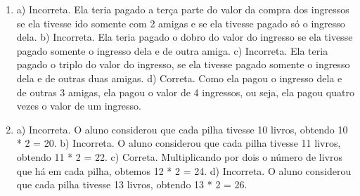 \begin{enumerate}
\item
a) Incorreta. Ela teria pagado a terça parte do valor da compra dos ingressos se ela
tivesse ido somente com 2 amigas e se ela tivesse pagado só o ingresso
dela.
b) Incorreta. Ela teria pagado o dobro do valor do ingresso se ela
tivesse pagado somente o ingresso dela e de outra amiga.
c) Incorreta. Ela teria pagado o triplo do valor do ingresso, se ela
tivesse pagado somente o ingresso dela e de outras duas amigas.
d) Correta. Como ela pagou o ingresso dela e de outras 3 amigas, ela
pagou o valor de 4 ingressos, ou seja, ela pagou quatro vezes o valor de um ingresso.

\item
a) Incorreta. O aluno considerou que cada pilha tivesse 10 livros, obtendo 10 * 2 = 20.
b) Incorreta. O aluno considerou que cada pilha tivesse 11 livros, obtendo 11 * 2 = 22.
c) Correta. Multiplicando por dois o número de livros que há em cada pilha, obtemos 12 * 2 = 24.
d) Incorreta. O aluno considerou que cada pilha tivesse 13 livros, obtendo 13 * 2 = 26.
\end{enumerate}


